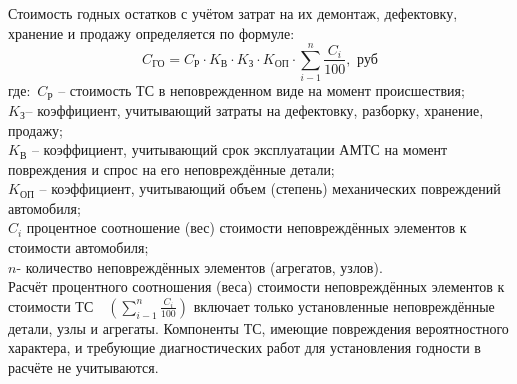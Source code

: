  Стоимость годных остатков с учётом затрат на их демонтаж, дефектовку, хранение и продажу определяется по формуле:
 \begin{equation}\label{go}
C_{\text{ГО}}= C_{\text{Р}} \cdot K_{\text{В}}\cdot K_{\text{З}}\cdot K_{\text{ОП}} \cdot  \sum\limits_{i-1}^{n}\frac{C_i}{100}, \, \, \text{руб} 
\end{equation}
\noindent где: \,$ C_{\text{Р}} $ -- стоимость ТС в неповрежденном виде на момент происшествия;\\
$ K_{\text{З}} $-- коэффициент, учитывающий затраты на дефектовку, разборку, хранение, продажу;\\
$ K_{\text{В}} $ -- коэффициент, учитывающий срок эксплуатации АМТС на момент повреждения и спрос на его неповреждённые детали;\\
$ K_{\text{ОП}} $ -- коэффициент, учитывающий объем (степень) механических повреждений автомобиля;\\
$ C_i $ процентное соотношение (вес) стоимости неповреждённых элементов к стоимости автомобиля;\\
$ n  $- количество неповреждённых элементов (агрегатов, узлов).\\

Расчёт процентного соотношения (веса) стоимости неповреждённых элементов к стоимости ТС   \,\,
   $  \left( \sum\limits_{i-1}^{n}\frac{C_i}{100} \right)  $  
включает только установленные неповреждённые детали, узлы и агрегаты. Компоненты ТС, имеющие повреждения  вероятностного характера, и требующие диагностических работ для установления годности в расчёте не учитываются. 
 
